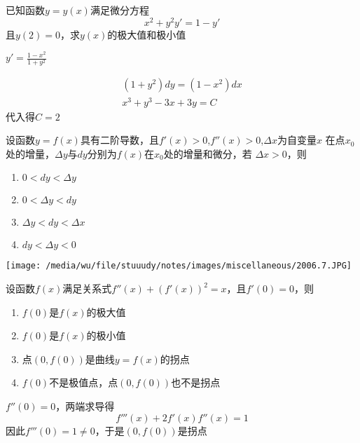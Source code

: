 \documentclass{article}
\begin{document}
\begin{examplle}[]
已知函数\(y=y(x)\)满足微分方程
\begin{equation*}
x^2+y^2y'=1-y'
\end{equation*}
且\(y(2)=0\)，求\(y(x)\)的极大值和极小值

\(y'=\frac{1-x^2}{1+y^2}\)

\begin{gather*}
(1+y^2)dy=(1-x^2)dx\\
x^3+y^3-3x+3y=C
\end{gather*}
代入得\(C=2\)
\end{examplle}

\begin{examplle}[]
设函数\(y=f(x)\)具有二阶导数，且\(f'(x)>0\),\(f''(x)>0\),\(\Delta x\)为自变量\(x\)
在点\(x_0\)处的增量，\(\Delta y\)与\(dy\)分别为\(f(x)\)在\(x_0\)处的增量和微分，若
\(\Delta x>0\)，则
\begin{enumerate}
\item \(0<dy<\Delta y\)
\item \(0<\Delta y<dy\)
\item \(\Delta y<dy<\Delta x\)
\item \(dy<\Delta y<0\)
\end{enumerate}


\begin{center}
\texttt{[image: /media/wu/file/stuuudy/notes/images/miscellaneous/2006.7.JPG]}
\end{center}
\end{examplle}

\begin{examplle}[]
设函数\(f(x)\)满足关系式\(f''(x)+(f'(x))^2=x\)，且\(f'(0)=0\)，则
\begin{enumerate}
\item \(f(0)\)是\(f(x)\)的极大值
\item \(f(0)\)是\(f(x)\)的极小值
\item 点\((0,f(0))\)是曲线\(y=f(x)\)的拐点
\item \(f(0)\)不是极值点，点\((0,f(0))\)也不是拐点
\end{enumerate}


\(f''(0)=0\)，两端求导得
\begin{equation*}
f'''(x)+2f'(x)f''(x)=1
\end{equation*}
因此\(f'''(0)=1\neq0\)，于是\((0,f(0))\)是拐点
\end{examplle}
\end{document}
